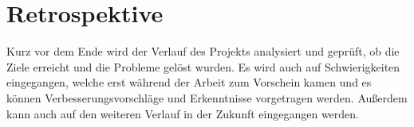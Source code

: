 \chapter{Retrospektive}
Kurz vor dem Ende wird der Verlauf des Projekts analysiert und geprüft, ob die Ziele erreicht und die Probleme gelöst wurden. Es wird auch auf Schwierigkeiten eingegangen, welche erst während der Arbeit zum Vorschein kamen und es können Verbesserungsvorschläge und Erkenntnisse vorgetragen werden.
Außerdem kann auch auf den weiteren Verlauf in der Zukunft eingegangen werden.